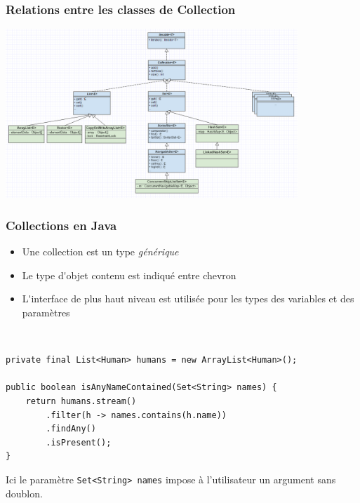 \begin{frame}[fragile]
	\frametitle{Relations entre les classes de Collection}
    \includegraphics[width=11cm]{img/collections.png}
\end{frame}

\begin{frame}[fragile]
	\frametitle{Collections en Java}
    \begin{itemize}
      \item Une collection est un type \textit{g\'{e}n\'{e}rique}
      \item Le type d\'{}objet contenu est indiqu\'{e} entre chevron
      \item L\'{}interface de plus haut niveau est utilis\'{e}e pour les types des variables et des param\`{e}tres
    \end{itemize}
    ~\\
    \begin{lstlisting}
private final List<Human> humans = new ArrayList<Human>();

public boolean isAnyNameContained(Set<String> names) {
	return humans.stream()
		.filter(h -> names.contains(h.name))
		.findAny()
		.isPresent();
}
	\end{lstlisting}
    Ici le param\`{e}tre {\lstinline[basicstyle=\ttfamily\color{blue}]|Set<String> names|} impose \`{a} l'utilisateur un argument sans doublon.
\end{frame}

